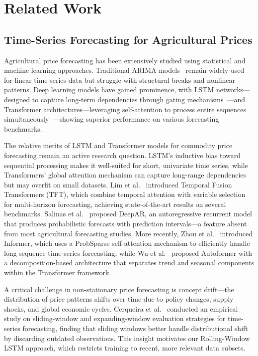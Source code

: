 \documentclass[journal]{IEEEtran}
\begin{document}
\section{Related Work}
\label{sec:related}

\subsection{Time-Series Forecasting for Agricultural Prices}

Agricultural price forecasting has been extensively studied using statistical and machine learning approaches. Traditional ARIMA models~\cite{boxjenkins} remain widely used for linear time-series data but struggle with structural breaks and nonlinear patterns. Deep learning models have gained prominence, with LSTM networks---designed to capture long-term dependencies through gating mechanisms~\cite{hochreiter1997lstm}---and Transformer architectures---leveraging self-attention to process entire sequences simultaneously~\cite{vaswani2017attention}---showing superior performance on various forecasting benchmarks.

The relative merits of LSTM and Transformer models for commodity price forecasting remain an active research question. LSTM's inductive bias toward sequential processing makes it well-suited for short, univariate time series, while Transformers' global attention mechanism can capture long-range dependencies but may overfit on small datasets. Lim et al.~\cite{lim2021tft} introduced Temporal Fusion Transformers (TFT), which combine temporal attention with variable selection for multi-horizon forecasting, achieving state-of-the-art results on several benchmarks. Salinas et al.~\cite{salinas2020deepar} proposed DeepAR, an autoregressive recurrent model that produces probabilistic forecasts with prediction intervals---a feature absent from most agricultural forecasting studies. More recently, Zhou et al.~\cite{zhou2021informer} introduced Informer, which uses a ProbSparse self-attention mechanism to efficiently handle long sequence time-series forecasting, while Wu et al.~\cite{wu2021autoformer} proposed Autoformer with a decomposition-based architecture that separates trend and seasonal components within the Transformer framework.

A critical challenge in non-stationary price forecasting is concept drift---the distribution of price patterns shifts over time due to policy changes, supply shocks, and global economic cycles. Cerqueira et al.~\cite{cerqueira2020} conducted an empirical study on sliding-window and expanding-window evaluation strategies for time-series forecasting, finding that sliding windows better handle distributional shift by discarding outdated observations. This insight motivates our Rolling-Window LSTM approach, which restricts training to recent, more relevant data subsets.
\end{document}
